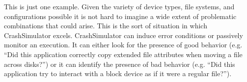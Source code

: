     This is just one example.  Given the variety of device types, file systems, and configurations possible it is not
    hard to imagine a wide extent of problematic combinations that could arise.  This is the sort of situation in which
    CrashSimulator excels.  CrashSimulator can induce error conditions or passively monitor an execution.  It can
    either look for the presence of good behavior (e.g. ``Did this application correctly copy extended file attributes
    when moving a file across disks?'') or it can identify the presence of bad behavior (e.g. ``Did this application try to
    interact with a block device as if it were a regular file?'').  
